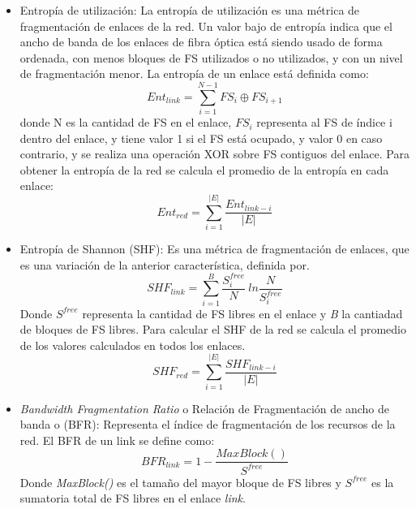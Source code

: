 \begin{itemize}
    \item Entropía de utilización\cite{wang2012utilization}: La entropía de utilización es una métrica de fragmentación de enlaces de la red.  Un valor bajo de entropía indica que el ancho de banda de los enlaces de fibra óptica está siendo usado de forma ordenada, con menos bloques de FS utilizados o no utilizados, y con un nivel de fragmentación menor.
    La entropía de un enlace está definida como:
    \begin{equation}
        Ent_{link} = \sum_{i=1}^{N-1} FS_{i} \oplus FS_{i + 1}
    \end{equation}
    donde N es la cantidad de FS en el enlace, \(FS_{i}\) representa al FS de índice i dentro del enlace, y tiene valor 1 si el FS está ocupado, y valor 0 en caso contrario, y se realiza una operación XOR sobre FS contiguos del enlace.
    Para obtener la entropía de la red se calcula el promedio de la entropía en cada enlace:
    \begin{equation}
        Ent_{red} = \sum_{i=1}^{\left | E \right |} \frac{Ent_{link - i}}{{\left | E \right |}}
    \end{equation}
    \item Entropía de Shannon (SHF)\cite{wright2015minimum}: Es una métrica de fragmentación de enlaces, que es una variación de la anterior característica, definida por.
    \begin{equation}
        SHF_{link} = \sum_{i=1}^{B} \frac{S_{i}^{free}}{N}~ln\frac{N}{S_{i}^{free}}
    \end{equation}
    Donde \(S^{free}\) representa la cantidad de FS libres en el enlace y \textit{B} la cantiadad de bloques de FS libres. Para calcular el SHF de la red se calcula el promedio de los valores calculados en todos los enlaces.
    \begin{equation}
        SHF_{red} = \sum_{i=1}^{\left | E \right |} \frac{SHF_{link - i}}{{\left | E \right |}}
    \end{equation}
    \item \textit{Bandwidth Fragmentation Ratio} o Relación de Fragmentación de ancho de banda o  (BFR)\cite{zhang2013bandwidth}: Representa el índice de fragmentación de los recursos de la red. El BFR de un link se define como:
    \begin{equation}
        BFR_{link} = 1 - \frac{MaxBlock()}{S^{free}}
    \end{equation}
    Donde \textit{MaxBlock()} es el tamaño del mayor bloque de FS libres y \(S^{free}\) es la sumatoria total de FS libres en el enlace \textit{link}.

\end{itemize}
